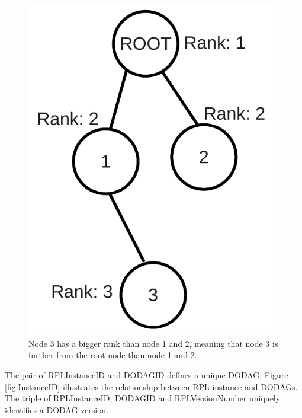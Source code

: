 \begin{figure}[htbp]
  \begin{center}
    \leavevmode
      \includegraphics[scale=0.35]{Pics/Rank.pdf}
    \caption{Node 3 has a bigger rank than node 1 and 2, meaning that node 3 is further from the root node than node 1 and 2.}
    \label{fig:Rank}
  \end{center}
\end{figure}

The pair of RPLInstanceID and DODAGID defines a unique DODAG, Figure \ref{fig:InstanceID} illustrates the relationship between RPL instance and DODAGs. 
The triple of RPLInstanceID, DODAGID and RPLVersionNumber uniquely identifies a DODAG version.


